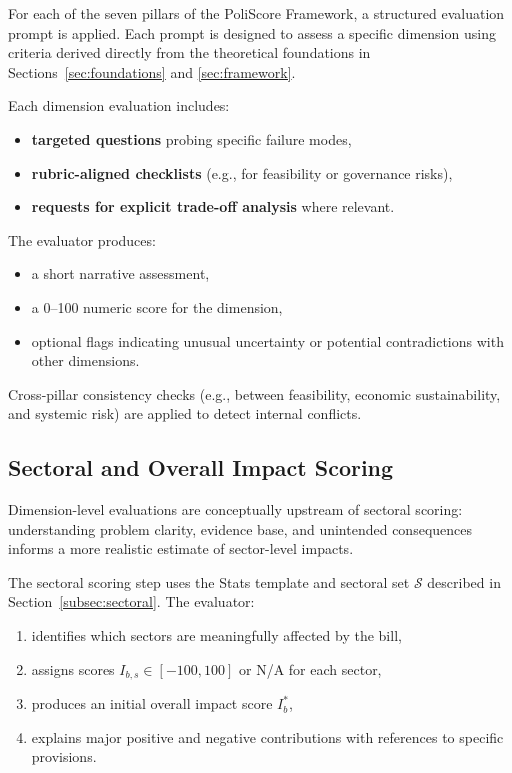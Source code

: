\documentclass[12pt]{article}
\begin{document}
For each of the seven pillars of the PoliScore Framework, a structured evaluation prompt is applied. Each prompt is
designed to assess a specific dimension using criteria derived directly from the theoretical foundations in
Sections~\ref{sec:foundations} and \ref{sec:framework}.

Each dimension evaluation includes:

\begin{itemize}
    \item \textbf{targeted questions} probing specific failure modes,
    \item \textbf{rubric-aligned checklists} (e.g., for feasibility or governance risks),
    \item \textbf{requests for explicit trade-off analysis} where relevant.
\end{itemize}

The evaluator produces:

\begin{itemize}
    \item a short narrative assessment,
    \item a 0--100 numeric score for the dimension,
    \item optional flags indicating unusual uncertainty or potential contradictions with other dimensions.
\end{itemize}

Cross-pillar consistency checks (e.g., between feasibility, economic sustainability, and systemic risk) are applied to
detect internal conflicts.

\subsection{Sectoral and Overall Impact Scoring}

Dimension-level evaluations are conceptually upstream of sectoral scoring: understanding problem clarity, evidence base,
and unintended consequences informs a more realistic estimate of sector-level impacts.

The sectoral scoring step uses the Stats template and sectoral set \(\mathcal{S}\) described in
Section~\ref{subsec:sectoral}. The evaluator:

\begin{enumerate}
    \item identifies which sectors are meaningfully affected by the bill,
    \item assigns scores \(I_{b,s} \in [-100, 100]\) or N/A for each sector,
    \item produces an initial overall impact score \(I_b^{\ast}\),
    \item explains major positive and negative contributions with references to specific provisions.
\end{enumerate}
\end{document}
